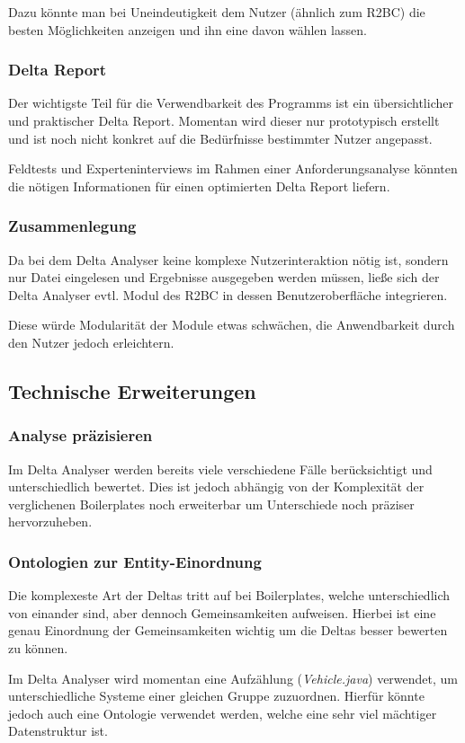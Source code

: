 \documentclass[12pt]{report}
\begin{document}
Dazu könnte man bei Uneindeutigkeit dem Nutzer (ähnlich zum R2BC) die besten Möglichkeiten anzeigen und ihn eine davon wählen lassen.
\subsubsection{Delta Report}
Der wichtigste Teil für die Verwendbarkeit des Programms ist ein übersichtlicher und praktischer Delta Report. Momentan  wird dieser nur prototypisch erstellt und ist noch nicht konkret auf die Bedürfnisse bestimmter Nutzer angepasst.

Feldtests und Experteninterviews im Rahmen einer Anforderungsanalyse könnten die nötigen Informationen für einen optimierten Delta Report liefern.
\subsubsection{Zusammenlegung}
Da bei dem Delta Analyser keine komplexe Nutzerinteraktion nötig ist, sondern nur Datei eingelesen und Ergebnisse ausgegeben werden müssen, ließe sich der Delta Analyser evtl. Modul des R2BC in dessen Benutzeroberfläche integrieren. 

Diese würde Modularität der Module etwas schwächen, die Anwendbarkeit durch den Nutzer jedoch erleichtern.
\subsection{Technische Erweiterungen}
\subsubsection{Analyse präzisieren}
Im Delta Analyser werden bereits viele verschiedene Fälle berücksichtigt und unterschiedlich bewertet. Dies ist jedoch abhängig von der Komplexität der verglichenen Boilerplates noch erweiterbar um Unterschiede noch präziser hervorzuheben. 
\subsubsection{Ontologien zur Entity-Einordnung}
Die komplexeste Art der Deltas tritt auf bei Boilerplates, welche unterschiedlich von einander sind, aber dennoch Gemeinsamkeiten aufweisen. Hierbei ist eine genau Einordnung der Gemeinsamkeiten wichtig um die Deltas besser bewerten zu können. 

Im Delta Analyser wird momentan eine Aufzählung (\textit{Vehicle.java}) verwendet, um unterschiedliche Systeme einer gleichen Gruppe zuzuordnen. Hierfür könnte jedoch auch eine Ontologie verwendet werden, welche eine sehr viel mächtiger Datenstruktur ist. 
\end{document}
